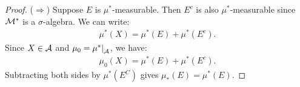     \begin{proof}
        ($\Rightarrow$) Suppose $E$ is $\mu^\ast$-measurable. Then $E^c$ is also $\mu^\ast$-measurable since $\mathcal{M}^\ast$ is a $\sigma$-algebra. We can write:
            \begin{equation*}
            \begin{split}
                \mu^\ast (X) = \mu^\ast(E) + \mu^\ast(E^c).
            \end{split}
            \end{equation*}
        Since $X\in \mathcal{A}$ and $\mu_0 = \restr{\mu^\ast}{\cA}$, we have:
            \begin{equation*}
            \begin{split}
                \mu_0(X) = \mu^\ast(E) + \mu^\ast(E^c).
            \end{split}
            \end{equation*}
        Subtracting both sides by $\mu^\ast(E^C)$ gives $\mu_\ast(E) = \mu^\ast(E)$. 


\end{proof}
